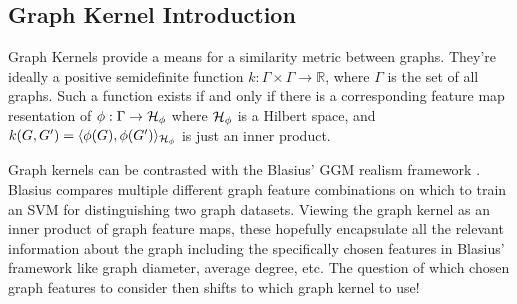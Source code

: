 


\subsection{Graph Kernel Introduction}
Graph Kernels provide a means for a similarity metric between graphs. They're ideally a positive semidefinite function $k: \Gamma \times \Gamma \rightarrow \mathbb{R}$, where $\Gamma$ is the set of all graphs. Such a function exists if and only if there is a corresponding feature map resentation of $\phi: \Gamma \to \mathcal{H}_\phi$ where $\mathcal{H}_\phi$ is a Hilbert space, and $k(G, G') = \langle \phi(G), \phi(G') \rangle_{\mathcal{H}_\phi}$ is just an inner product.

Graph kernels can be contrasted with the Blasius' GGM realism framework . Blasius compares multiple different graph feature combinations on which to train an SVM for distinguishing two graph datasets.
Viewing the graph kernel as an inner product of graph feature maps, these hopefully encapsulate all the relevant information about the graph including the specifically chosen features in Blasius' framework like graph diameter, average degree, etc. The question of which chosen graph features to consider then shifts to which graph kernel to use!





